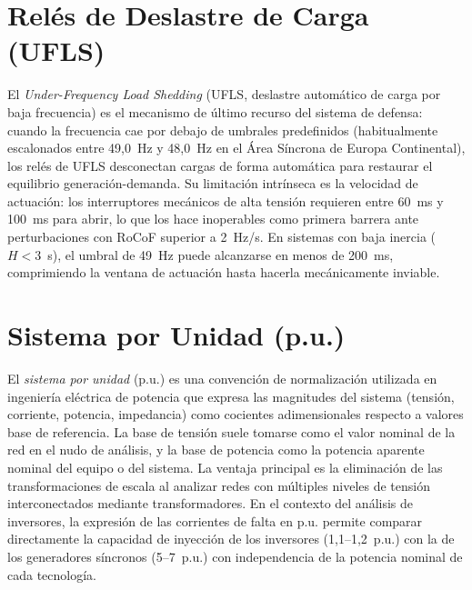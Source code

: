 \section{Relés de Deslastre de Carga (UFLS)}
\label{anexo:ufls}
El \textit{Under-Frequency Load Shedding} (UFLS, deslastre automático de
carga por baja frecuencia) es el mecanismo de último recurso del sistema
de defensa: cuando la frecuencia cae por debajo de umbrales predefinidos
(habitualmente escalonados entre 49{,}0~Hz y 48{,}0~Hz en el Área
Síncrona de Europa Continental), los relés de UFLS desconectan cargas de
forma automática para restaurar el equilibrio generación-demanda. Su
limitación intrínseca es la velocidad de actuación: los interruptores
mecánicos de alta tensión requieren entre 60~ms y 100~ms para abrir, lo
que los hace inoperables como primera barrera ante perturbaciones con
RoCoF superior a 2~Hz/s. En sistemas con baja inercia ($H < 3$~s), el
umbral de 49~Hz puede alcanzarse en menos de 200~ms, comprimiendo la
ventana de actuación hasta hacerla mecánicamente inviable.

\section{Sistema por Unidad (p.u.)}
\label{anexo:pu}
El \textit{sistema por unidad} (p.u.) es una convención de normalización
utilizada en ingeniería eléctrica de potencia que expresa las magnitudes
del sistema (tensión, corriente, potencia, impedancia) como cocientes
adimensionales respecto a valores base de referencia. La base de tensión
suele tomarse como el valor nominal de la red en el nudo de análisis, y
la base de potencia como la potencia aparente nominal del equipo o del
sistema. La ventaja principal es la eliminación de las transformaciones
de escala al analizar redes con múltiples niveles de tensión
interconectados mediante transformadores. En el contexto del análisis de
inversores, la expresión de las corrientes de falta en p.u. permite
comparar directamente la capacidad de inyección de los inversores
(1{,}1--1{,}2~p.u.) con la de los generadores síncronos (5--7~p.u.)
con independencia de la potencia nominal de cada tecnología.

